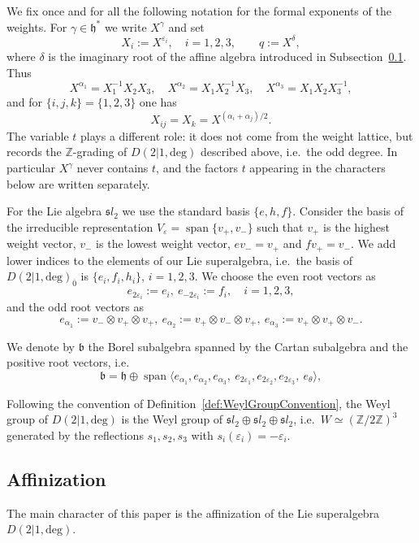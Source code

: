 \documentclass[10pt]{amsart}
\newcommand{\fsl}{{\mathfrak sl}}
\newcommand{\fb}{{\mathfrak b}}
\newcommand{\fh}{{\mathfrak h}}
\newcommand{\Ddeg}{D(2|1,\mathrm{deg})}
\newcommand{\spn}{\operatorname{span}}
\begin{document}
	We fix once and for all the following notation for the formal exponents of the weights. For $\gamma \in \fh^*$ we write $X^{\gamma}$ and set
	\[X_i:=X^{\varepsilon_i},\quad i=1,2,3,\qquad q:=X^{\delta},\]
	where $\delta$ is the imaginary root of the affine algebra introduced in Subsection~\ref{ssec:Affinization}. Thus
	\[X^{\alpha_1}=X_1^{-1}X_2X_3,\quad X^{\alpha_2}=X_1X_2^{-1}X_3,\quad X^{\alpha_3}=X_1X_2X_3^{-1},\]
	and for $\{i,j,k\}=\{1,2,3\}$ one has
	\begin{equation*}\label{eq:XviaAlpha}
		X_{ij}=X_{k}=X^{(\alpha_i+\alpha_j)/2}.
	\end{equation*}
	The variable $t$ plays a different role: it does not come from the weight lattice, but records the $\mathbb{Z}$-grading of $\Ddeg$ described above, i.e.\ the odd degree. In particular $X^{\gamma}$ never contains $t$, and the factors $t$ appearing in the characters below are written separately.
	
	For the Lie algebra $\fsl_2$ we use the standard basis $\{e,h,f\}$.
	Consider the basis of the irreducible representation $V_\varepsilon=\spn\{v_+,v_-\}$ such that $v_+$ is the highest weight vector, $v_-$ is the lowest weight vector, $e v_-=v_+$ and $f v_+ =v_-$. We add lower indices to the elements of our Lie superalgebra, i.e.\ the basis of $\Ddeg_{\overline 0}$ is $\{e_i, f_i, h_i\}$, $i=1,2,3$.
	We choose the even root vectors as
	\[e_{2 \varepsilon_i}:=e_{i},~ e_{-2 \varepsilon_i}:=f_{i},\quad i=1,2,3,\]
	and the odd root vectors as
	\[e_{\alpha_1}:=v_- \otimes v_+ \otimes v_+, ~e_{\alpha_2}:=v_+ \otimes v_- \otimes v_+, ~e_{\alpha_3}:=v_+ \otimes v_+ \otimes v_-.\]
	
	We denote by $\fb$ the Borel subalgebra spanned by the Cartan subalgebra and the positive root vectors, i.e.
	\[\fb =\fh \oplus \spn \langle e_{\alpha_1}, e_{\alpha_2}, e_{\alpha_3},\ 
	e_{2\varepsilon_1}, e_{2\varepsilon_2}, e_{2\varepsilon_3},\ e_{\theta}\rangle,\]
	
	Following the convention of Definition~\ref{def:WeylGroupConvention}, the Weyl group of $\Ddeg$ is the Weyl group of $\fsl_2\oplus\fsl_2\oplus \fsl_2$, i.e.\ $W \simeq (\mathbb{Z}/2\mathbb{Z})^3$ generated by the reflections $s_1,s_2,s_3$ with $s_i(\varepsilon_i)=-\varepsilon_i$.
	
	\subsection{Affinization}\label{ssec:Affinization}
	The main character of this paper is the affinization of the Lie superalgebra $\Ddeg$.
	
\end{document}
